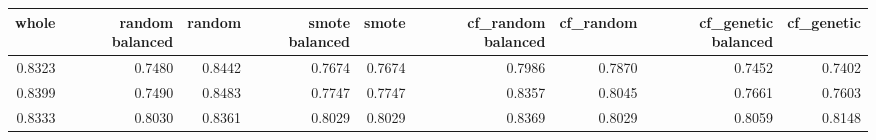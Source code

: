 \begin{tabular}{rrrrrrrrr}
\toprule

 whole &  random balanced &  random &  smote balanced &  smote &  cf\_random balanced &  cf\_random &  cf\_genetic balanced &  cf\_genetic \\
\midrule

0.8323 &           0.7480 &  0.8442 &          0.7674 & 0.7674 &              0.7986 &     0.7870 &               0.7452 &      0.7402 \\
0.8399 &           0.7490 &  0.8483 &          0.7747 & 0.7747 &              0.8357 &     0.8045 &               0.7661 &      0.7603 \\
0.8333 &           0.8030 &  0.8361 &          0.8029 & 0.8029 &              0.8369 &     0.8029 &               0.8059 &      0.8148 \\

\bottomrule
\end{tabular}
